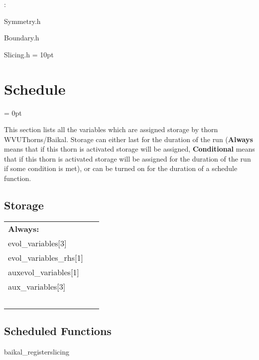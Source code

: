 \vspace{5mm}

: 

Symmetry.h

Boundary.h

Slicing.h
\vspace{2mm}\parskip = 10pt 

\section{Schedule} 


\parskip = 0pt


\noindent This section lists all the variables which are assigned storage by thorn WVUThorns/Baikal.  Storage can either last for the duration of the run ({\bf Always} means that if this thorn is activated storage will be assigned, {\bf Conditional} means that if this thorn is activated storage will be assigned for the duration of the run if some condition is met), or can be turned on for the duration of a schedule function.


\subsection*{Storage}

\hspace{5mm}

 \begin{tabular*}{160mm}{ll} 

{\bf Always:}&  ~ \\ 
 evol\_variables[3] & ~\\ 
 evol\_variables\_rhs[1] & ~\\ 
 auxevol\_variables[1] & ~\\ 
 aux\_variables[3] & ~\\ 
~ & ~\\ 
\end{tabular*} 


\subsection*{Scheduled Functions}
\vspace{5mm}


\hspace{5mm} baikal\_registerslicing 

\hspace{5mm}{\it register 3+1 slicing condition } 


